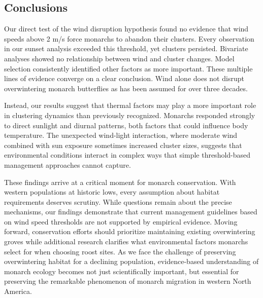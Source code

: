 \subsection{Conclusions}

Our direct test of the wind disruption hypothesis found no evidence that wind speeds above 2 m/s force monarchs to abandon their clusters. Every observation in our sunset analysis exceeded this threshold, yet clusters persisted. Bivariate analyses showed no relationship between wind and cluster changes. Model selection consistently identified other factors as more important. These multiple lines of evidence converge on a clear conclusion. Wind alone does not disrupt overwintering monarch butterflies as has been assumed for over three decades.

Instead, our results suggest that thermal factors may play a more important role in clustering dynamics than previously recognized. Monarchs responded strongly to direct sunlight and diurnal patterns, both factors that could influence body temperature. The unexpected wind-light interaction, where moderate wind combined with sun exposure sometimes increased cluster sizes, suggests that environmental conditions interact in complex ways that simple threshold-based management approaches cannot capture.

These findings arrive at a critical moment for monarch conservation. With western populations at historic lows, every assumption about habitat requirements deserves scrutiny. While questions remain about the precise mechanisms, our findings demonstrate that current management guidelines based on wind speed thresholds are not supported by empirical evidence. Moving forward, conservation efforts should prioritize maintaining existing overwintering groves while additional research clarifies what environmental factors monarchs select for when choosing roost sites. As we face the challenge of preserving overwintering habitat for a declining population, evidence-based understanding of monarch ecology becomes not just scientifically important, but essential for preserving the remarkable phenomenon of monarch migration in western North America.
